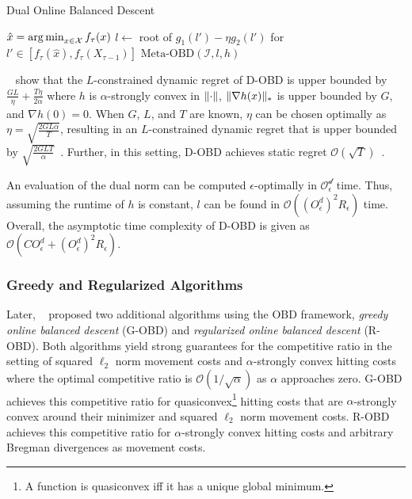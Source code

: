 \begin{algorithm}
    \caption{Dual Online Balanced Descent~\cite{Goel2018}}\label{alg:md:dobd}
    $\hat{x} = \operatorname*{arg\,min}_{x \in \mathcal{X}} f_{\tau}(x)$\;
    $l \gets $ root of $g_1(l') - \eta g_2(l')$ for $l' \in [f_{\tau}(\hat{x}), f_{\tau}(X_{\tau-1})]$\;
    \Return $\text{Meta-OBD}(\mathcal{I}, l, h)$\;
\end{algorithm}

\citeauthor*{Goel2018}~\cite{Goel2018} show that the $L$-constrained dynamic regret of D-OBD is upper bounded by $\frac{G L}{\eta} + \frac{T \eta}{2 \alpha}$ where $h$ is $\alpha$-strongly convex in $\lVert\cdot\rVert$, $\lVert\nabla h(x)\rVert_*$ is upper bounded by $G$, and $\nabla h(0) = 0$. When $G$, $L$, and $T$ are known, $\eta$ can be chosen optimally as $\eta = \sqrt{\frac{2 G L \alpha}{T}}$, resulting in an $L$-constrained dynamic regret that is upper bounded by $\sqrt{\frac{2 G L T}{\alpha}}$~\cite{Goel2018}. Further, in this setting, D-OBD achieves static regret $\mathcal{O}(\sqrt{T})$~\cite{Goel2018}.

An evaluation of the dual norm can be computed $\epsilon$-optimally in $\mathcal{O_{\epsilon}^d}$ time. Thus, assuming the runtime of $h$ is constant, $l$ can be found in $\mathcal{O}((O_{\epsilon}^d)^2 R_{\epsilon})$ time. Overall, the asymptotic time complexity of D-OBD is given as $\mathcal{O}(C O_{\epsilon}^d + (O_{\epsilon}^d)^2 R_{\epsilon})$.

\subsubsection{Greedy and Regularized Algorithms}

Later, \citeauthor*{Goel2019}~\cite{Goel2019} proposed two additional algorithms using the OBD framework, \emph{greedy online balanced descent} (G-OBD) and \emph{regularized online balanced descent} (R-OBD). Both algorithms yield strong guarantees for the competitive ratio in the setting of squared $\ell_2$ norm movement costs and $\alpha$-strongly convex hitting costs where the optimal competitive ratio is $\mathcal{O}(1 / \sqrt{\alpha})$ as $\alpha$ approaches zero. G-OBD achieves this competitive ratio for quasiconvex\footnote{A function is quasiconvex iff it has a unique global minimum.} hitting costs that are $\alpha$-strongly convex around their minimizer and squared $\ell_2$ norm movement costs. R-OBD achieves this competitive ratio for $\alpha$-strongly convex hitting costs and arbitrary Bregman divergences as movement costs.

